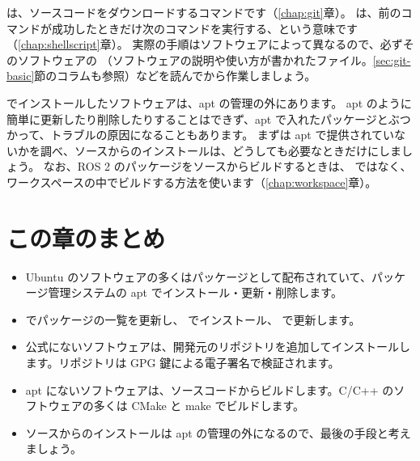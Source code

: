 
 は、ソースコードをダウンロードするコマンドです（\ref{chap:git}章）。
\cmd{\&\&} は、前のコマンドが成功したときだけ次のコマンドを実行する、という意味です（\ref{chap:shellscript}章）。
実際の手順はソフトウェアによって異なるので、必ずそのソフトウェアの （ソフトウェアの説明や使い方が書かれたファイル。\ref{sec:git-basic}節のコラムも参照）などを読んでから作業しましょう。

\begin{caution}[ソースからのインストールは最後の手段]
   でインストールしたソフトウェアは、apt の管理の外にあります。
  apt のように簡単に更新したり削除したりすることはできず、apt で入れたパッケージとぶつかって、トラブルの原因になることもあります。
  まずは apt で提供されていないかを調べ、ソースからのインストールは、どうしても必要なときだけにしましょう。
  なお、ROS 2 のパッケージをソースからビルドするときは、 ではなく、ワークスペースの中でビルドする方法を使います（\ref{chap:workspace}章）。
\end{caution}

\section*{この章のまとめ}

\begin{itemize}
  \item Ubuntu のソフトウェアの多くはパッケージとして配布されていて、パッケージ管理システムの apt でインストール・更新・削除します。
  \item {} でパッケージの一覧を更新し、 でインストール、 で更新します。
  \item 公式にないソフトウェアは、開発元のリポジトリを追加してインストールします。リポジトリは GPG 鍵による電子署名で検証されます。
  \item apt にないソフトウェアは、ソースコードからビルドします。C/C++ のソフトウェアの多くは CMake と make でビルドします。
  \item ソースからのインストールは apt の管理の外になるので、最後の手段と考えましょう。
\end{itemize}

